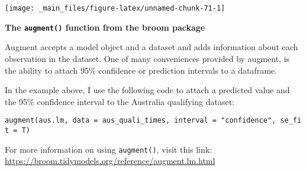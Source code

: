 \documentclass[
]{book}
\begin{document}
\begin{center}\texttt{[image: \_main\_files/figure-latex/unnamed-chunk-71-1]} \end{center}

\begin{blackbox}

\begin{center}
\textbf{The \texttt{augment()} function from the broom package}

\end{center}

Augment accepts a model object and a dataset and adds information about each observation in the dataset. One of many conveniences provided by augment, is the ability to attach 95\% confidence or prediction intervals to a dataframe.

In the example above, I use the following code to attach a predicted value and the 95\% confidence interval to the Australia qualifying dataset:

\texttt{augment(aus.lm,\ data\ =\ aus\_quali\_times,\ interval\ =\ "confidence",\ se\_fit\ =\ T)}

For more information on using \texttt{augment()}, visit this link: \url{https://broom.tidymodels.org/reference/augment.lm.html}

\end{blackbox}
\end{document}
